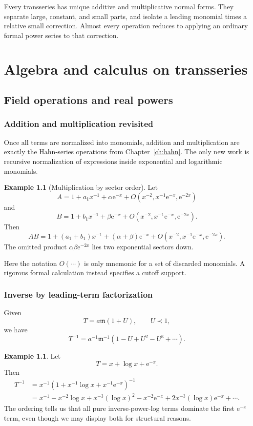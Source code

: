 \documentclass[11pt,oneside]{book}
\theoremstyle{definition}
\newtheorem{example}[theorem]{Example}
\theoremstyle{remark}
\newcommand{\m}{\mathfrak{m}}
\newcommand{\e}{\mathrm{e}}
\newcommand{\bigO}{O}
\newcommand{\precdom}{\prec}
\begin{document}
\begin{summarybox}
Every transseries has unique additive and multiplicative normal forms. They
separate large, constant, and small parts, and isolate a leading monomial times a
relative small correction. Almost every operation reduces to applying an
ordinary formal power series to that correction.
\end{summarybox}


\part{Algebra and calculus on transseries}

\chapter{Field operations and real powers}
\label{ch:field-ops}

\section{Addition and multiplication revisited}

Once all terms are normalized into monomials, addition and multiplication are
exactly the Hahn-series operations from Chapter~\ref{ch:hahn}. The only new work
is recursive normalization of expressions inside exponential and logarithmic
monomials.

\begin{example}[Multiplication by sector order]
Let
\[
  A=1+a_1x^{-1}+\alpha\e^{-x}+\bigO(x^{-2},x^{-1}\e^{-x},\e^{-2x})
\]
and
\[
  B=1+b_1x^{-1}+\beta\e^{-x}+\bigO(x^{-2},x^{-1}\e^{-x},\e^{-2x}).
\]
Then
\[
  AB=1+(a_1+b_1)x^{-1}+(\alpha+\beta)\e^{-x}
     +\bigO(x^{-2},x^{-1}\e^{-x},\e^{-2x}).
\]
The omitted product $\alpha\beta\e^{-2x}$ lies two exponential sectors down.
\end{example}

Here the notation $\bigO(\cdots)$ is only mnemonic for a set of discarded
monomials. A rigorous formal calculation instead specifies a cutoff support.

\section{Inverse by leading-term factorization}

Given
\[
  T=a\m(1+U),\qquad U\precdom1,
\]
we have
\[
  T^{-1}=a^{-1}\m^{-1}(1-U+U^2-U^3+\cdots).
\]

\begin{example}
Let
\[
  T=x+\log x+\e^{-x}.
\]
Then
\begin{align*}
 T^{-1}
 &=x^{-1}
   \left(1+x^{-1}\log x+x^{-1}\e^{-x}\right)^{-1}\\
 &=x^{-1}-x^{-2}\log x+x^{-3}(\log x)^2
   -x^{-2}\e^{-x}
   +2x^{-3}(\log x)\e^{-x}+\cdots.
\end{align*}
The ordering tells us that all pure inverse-power-log terms dominate the first
$\e^{-x}$ term, even though we may display both for structural reasons.
\end{example}
\end{document}
